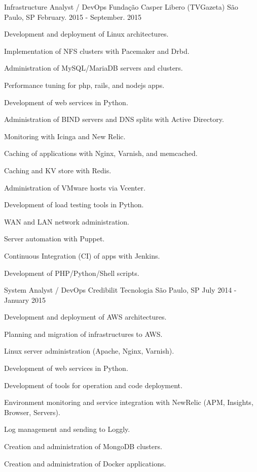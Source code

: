 \begin{cventries}
  \cventry
  {Infrastructure Analyst / DevOps} %
  {Fundação Casper Libero (TVGazeta)} %
  {São Paulo, SP} %
  {February. 2015 - September. 2015} %
  {
    \begin{cvitems} %
      \item {Development and deployment of Linux architectures.}
      \item {Implementation of NFS clusters with Pacemaker and Drbd.}
      \item {Administration of MySQL/MariaDB servers and clusters.}
      \item {Performance tuning for php, rails, and nodejs apps.}
      \item {Development of web services in Python.}
      \item {Administration of BIND servers and DNS splits with Active Directory.}
      \item {Monitoring with Icinga and New Relic.}
      \item {Caching of applications with Nginx, Varnish, and memcached.}
      \item {Caching and KV store with Redis.}
      \item {Administration of VMware hosts via Vcenter.}
      \item {Development of load testing tools in Python.}
      \item {WAN and LAN network administration.}
      \item {Server automation with Puppet.}
      \item {Continuous Integration (CI) of apps with Jenkins.}
      \item {Development of PHP/Python/Shell scripts.}
    \end{cvitems}
  }

\cventry
{System Analyst / DevOps} %
{Credibilit Tecnologia} %
{São Paulo, SP} %
{July 2014 - January 2015} %
{
  \begin{cvitems} %
    \item {Development and deployment of AWS architectures.}
    \item {Planning and migration of infrastructures to AWS.}
    \item {Linux server administration (Apache, Nginx, Varnish).}
    \item {Development of web services in Python.}
    \item {Development of tools for operation and code deployment.}
    \item {Environment monitoring and service integration with NewRelic (APM, Insights, Browser, Servers).}
    \item {Log management and sending to Loggly.}
    \item {Creation and administration of MongoDB clusters.}
    \item {Creation and administration of Docker applications.}
  \end{cvitems}
}


\end{cventries}

